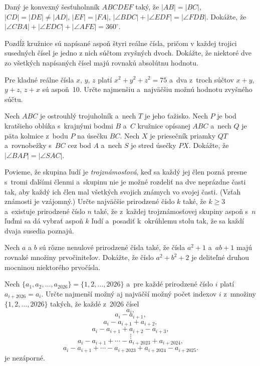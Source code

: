 {%
Daný je konvexný šesťuholnník $ABCDEF$ taký, že $|AB| = |BC|$, $|CD| = |DE| \ne |AD|$, $|EF| = |FA|$, $|\angle BDC| + |\angle EDF| = |\angle FDB|$. Dokážte, že $|\angle CBA| + |\angle EDC| + |\angle AFE| = 360^\circ$.}

{%
Pozdĺž kružnice sú napísané aspoň štyri reálne čísla, pričom v každej trojici susedných čísel je jedno z nich
súčtom zvyšných dvoch. Dokážte, že niektoré dve zo všetkých napísaných čísel majú rovnakú absolútnu hodnotu.}

{%
Pre kladné reálne čísla $x$, $y$, $z$ platí $x^2+y^2+z^2=75$ a~dva z~troch súčtov $x+y$, $y+z$, $z+x$ sú aspoň~10. Určte najmenšiu a~najväčšiu možnú hodnotu zvyšného súčtu.}

{%
Nech $ABC$ je ostrouhlý trojuholník a~nech $T$ je jeho ťažisko. Nech $P$ je bod kratšieho oblúka s~krajnými bodmi $B$ a~$C$ kružnice opísanej $ABC$ a~nech $Q$ je päta kolmice z~bodu $P$ na úsečku $BC$. Nech $X$ je priesečník priamky $QT$ a~rovnobežky s~$BC$ cez bod $A$ a~nech $S$ je stred úsečky $PX$. Dokážte, že $|\angle BAP|=|\angle SAC|$.}

{%
Povieme, že skupina ľudí je \emph{trojznámosťová}, keď sa každý jej člen pozná presne s~tromi ďalšími členmi a~skupinu nie je možné rozdeliť na dve neprázdne časti tak, aby každý ich člen mal všetkých svojich známych vo svojej časti. (Vzťah známosti je vzájomný.) Určte najväčšie prirodzené číslo $k$ také, že $k\ge 3$ a~existuje prirodzené číslo $n$ také, že z~každej trojznámosťovej skupiny aspoň s~$n$ ľuďmi sa dá vybrať aspoň $k$ ľudí a~posadiť k~okrúhlemu stolu tak, že sa každí dvaja susedia poznajú.}

{%
Nech $a$ a $b$ sú rôzne nenulové prirodzené čísla také, že čísla $a^2+1$ a~$ab+1$ majú rovnaké množiny prvočiniteľov. Dokážte, že číslo $a^2+b^2+2$ je deliteľné druhou mocninou niektorého prvočísla.}

{%
Nech $\{a_1,a_2,\dots,a_{2026}\}=\{1,2,\dots,2026\}$ a~pre každé prirodzené číslo $i$ platí $a_{i+2026}=a_i$. Určte najmenší možný aj najväčší možný počet indexov $i$ z~množiny $\{1,2,\dots,2026\}$ takých, že každé z~2026 čísel
$$
a_i,
$$
$$
a_i-a_{i+1},
$$
$$
a_i-a_{i+1}+a_{i+2},
$$
$$
a_i-a_{i+1}+a_{i+2}-a_{i+3},
$$
$$
\vdots
$$
$$
a_i-a_{i+1}+\cdots-a_{i+2023}+a_{i+2024},
$$
$$
a_i-a_{i+1}+\cdots-a_{i+2023}+a_{i+2024}-a_{i+2025}.
$$
je nezáporné.}

